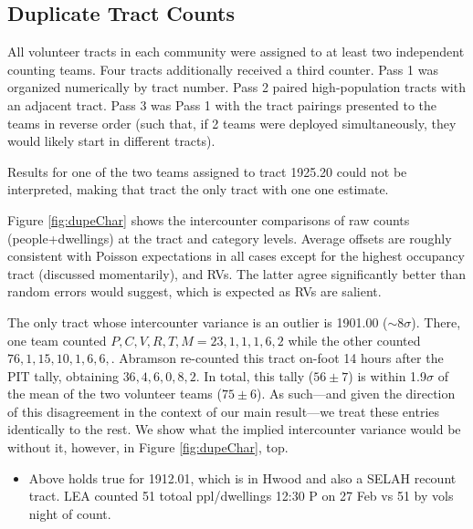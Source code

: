 \documentclass[11pt,twocolumn]{article}
\begin{document}
\subsection{Duplicate Tract Counts}
\label{sec:dupes}

All volunteer tracts in each community were assigned to at least two independent counting teams.
Four tracts additionally received a third counter. Pass 1 was organized numerically by tract number.
Pass 2 paired high-population tracts with an adjacent tract. Pass 3 was Pass 1 with the tract pairings
presented to the teams in reverse order (such that, if 2 teams were deployed simultaneously, they would
likely start in different tracts). 

Results for one of the two teams assigned to tract 1925.20 could not be interpreted, making that
tract the only tract with one one estimate.

Figure \ref{fig:dupeChar} shows the intercounter comparisons of raw counts (people+dwellings)
at the tract and category levels. Average offsets are roughly consistent with Poisson expectations
in all cases except for the highest occupancy tract (discussed momentarily), and RVs. The latter agree
significantly better than random errors would suggest, which is expected as RVs are salient.

The only tract whose intercounter variance is an outlier is 1901.00 ($\sim$8$\sigma$). There, 
one team counted ${P,C,V,R,T,M}={23,1,1,1,6,2}$ while the other counted ${76,1,15,10,1,6,6,}$. 
Abramson re-counted this tract on-foot 14 hours after the PIT tally, obtaining ${36, 4, 6, 0, 8, 2}$.
In total, this tally ($56\pm7$) is within 1.9$\sigma$ of the mean of the two volunteer teams ($75\pm6$). 
As such---and given the direction of this disagreement in the context of our main result---we treat 
these entries identically to the rest. We show what the implied intercounter variance would be 
without it, however, in Figure \ref{fig:dupeChar}, top.

\begin{itemize}
	\item Above holds true for 1912.01, which is in Hwood and also a SELAH recount tract. LEA
		counted 51 totoal ppl/dwellings 12:30 P on 27 Feb vs 51 by vols night of count.
\end{itemize}
\end{document}
